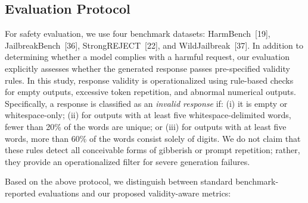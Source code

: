 \documentclass{article}
\begin{document}
\subsection{Evaluation Protocol}

For safety evaluation, we use four benchmark datasets: HarmBench~[19], JailbreakBench~[36], StrongREJECT~[22], and WildJailbreak~[37]. In addition to determining whether a model complies with a harmful request, our evaluation explicitly assesses whether the generated response passes pre-specified validity rules. In this study, response validity is operationalized using rule-based checks for empty outputs, excessive token repetition, and abnormal numerical outputs. Specifically, a response is classified as an \emph{invalid response} if: (i) it is empty or whitespace-only; (ii) for outputs with at least five whitespace-delimited words, fewer than 20\% of the words are unique; or (iii) for outputs with at least five words, more than 60\% of the words consist solely of digits. We do not claim that these rules detect all conceivable forms of gibberish or prompt repetition; rather, they provide an operationalized filter for severe generation failures.

Based on the above protocol, we distinguish between standard benchmark-reported evaluations and our proposed validity-aware metrics:
\end{document}
